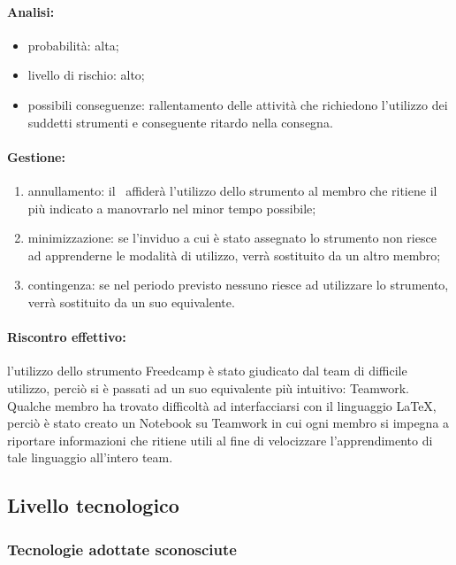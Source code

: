 \documentclass[../PianoProgetto.tex]{subfiles}
\begin{document}
	\paragraph*{Analisi:}
	\begin{itemize}
		\item probabilità: alta;
		\item livello di rischio: alto;
		\item possibili conseguenze: rallentamento delle attività che richiedono l’utilizzo dei suddetti strumenti e conseguente ritardo nella consegna.
	\end{itemize}
	
	\paragraph*{Gestione:}
	\begin{enumerate}
		\item annullamento: il \responsabilediprogetto\ affiderà l'utilizzo dello strumento al membro che ritiene il più indicato a manovrarlo nel minor tempo possibile;
		\item minimizzazione: se l’inviduo a cui è stato assegnato lo strumento non riesce ad apprenderne le modalità di utilizzo, verrà sostituito da un altro membro;
		\item contingenza: se nel periodo previsto nessuno riesce ad utilizzare lo strumento, verrà sostituito da un suo equivalente. 
	\end{enumerate}	
	
	\paragraph*{Riscontro effettivo:} l'utilizzo dello strumento Freedcamp è stato giudicato dal team di difficile utilizzo, perciò si è passati ad un suo equivalente più intuitivo: Teamwork.
	Qualche membro ha trovato difficoltà ad interfacciarsi con il linguaggio LaTeX, perciò è stato creato un Notebook su Teamwork in cui ogni membro si impegna a riportare informazioni che ritiene utili al fine di velocizzare l'apprendimento di tale linguaggio all'intero team.

\subsection{Livello tecnologico}

\subsubsection{Tecnologie adottate sconosciute}
\end{document}
